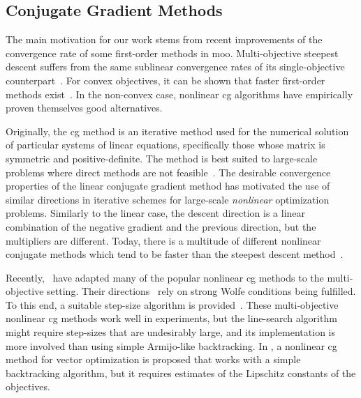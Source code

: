 \documentclass{article}
\theoremstyle{plain}
\theoremstyle{definition}
\begin{document}
\subsection*{Conjugate Gradient Methods}

The main motivation for our work stems from recent improvements of the convergence rate
of some first-order methods in \ac{moo}.
Multi-objective steepest descent suffers from the same sublinear convergence rates 
of its single-objective counterpart~\cite{fliegeComplexityGradientDescent2019}.
For convex objectives, it can be shown that faster first-order methods 
exist~\cite{%
tanabeAcceleratedProximalGradient2023,%
sonntagFastMultiobjectiveGradient2022%
}. 
In the non-convex case, nonlinear \ac{cg} algorithms have empirically proven themselves
good alternatives.


Originally, the \ac{cg} method is an iterative method used for the 
numerical solution of particular systems of linear equations, 
specifically those whose matrix is symmetric and positive-definite. 
The method is best suited to large-scale problems where direct methods 
are not feasible~\cite{nocedalNumericalOptimization2006}.
The desirable convergence properties of the linear conjugate gradient method 
has motivated the use of similar directions in iterative schemes for 
large-scale \emph{nonlinear} optimization
problems. 
Similarly to the linear case, the descent direction is a linear combination 
of the negative gradient and the previous direction, but the 
multipliers are different.
Today, there is a multitude of different nonlinear conjugate methods
which tend to be faster than the steepest descent method~\cite{nocedalNumericalOptimization2006}.

Recently,~\citet{lucambioperezNonlinearConjugateGradient2018} have adapted 
many of the popular nonlinear \ac{cg} methods to the multi-objective setting.
Their directions~\cite{%
goncalvesExtensionHagerZhang2020,%
lucambioperezNonlinearConjugateGradient2018%
} rely on strong Wolfe conditions being fulfilled.
To this end, a suitable step-size algorithm is provided~\cite{lucambioperezWolfeLineSearch2019}.
These multi-objective nonlinear \ac{cg} methods work well in experiments, 
but the line-search algorithm might require step-sizes that are 
undesirably large,
and its implementation is more involved than using simple Armijo-like backtracking.
In \cite{goncalvesStudyLiuStoreyConjugate2022}, a nonlinear \ac{cg}
method for vector optimization is proposed that works with a simple 
backtracking algorithm, but it requires estimates of the Lipschitz constants
of the objectives.
\end{document}
